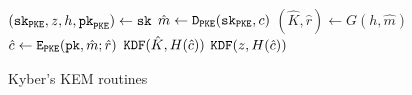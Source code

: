 \documentclass{article}
\begin{document}
\begin{figure}[H]
\begin{minipage}{0.33\textwidth}
\begin{algorithm}[H]
            \caption{$\decap_\monospace{KyberKEM}(\sk, c)$}\label{alg:kyber-kem-decap}
            \begin{algorithmic}[1]
                \State $(\texttt{sk}_\texttt{PKE}, z, h, \texttt{pk}_\texttt{PKE}) \leftarrow \texttt{sk}$
                \State $\hat{m} \leftarrow \texttt{D}_\texttt{PKE}(\texttt{sk}_\texttt{PKE}, c)$
                \State $(\hat{K}, \hat{r}) \leftarrow G(h, \hat{m})$
                \State $\hat{c} \leftarrow \texttt{E}_\texttt{PKE}(\texttt{pk}, \hat{m}; \hat{r})$
                    \State \Return $\texttt{KDF}(\hat{K}, H(\hat{c}))$
                \Else
                    \State \Return $\texttt{KDF}(z, H(\hat{c}))$
                \EndIf
            \end{algorithmic}
        \end{algorithm}
    \end{minipage}
    \caption{Kyber's KEM routines}\label{fig:kyber-kem-routines}
\end{figure}
\end{document}

